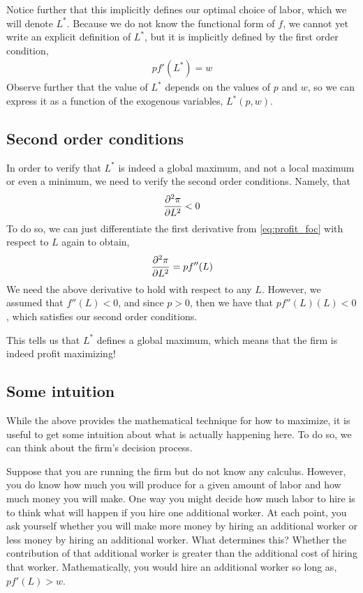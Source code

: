Notice further that this implicitly defines our optimal choice of labor, which we will denote $L^*$. Because we do not know the functional form of $f$, we cannot yet write an explicit definition of $L^*$, but it is implicitly defined by the first order condition,
\begin{align}
    p f'(L^*) = w \label{eq:general_foc}
\end{align}
Observe further that the value of $L^*$ depends on the values of $p$ and $w$, so we can express it as a function of the exogenous variables, $L^*(p, w)$. 

\subsection*{Second order conditions}
In order to verify that $L^*$ is indeed a global maximum, and not a local maximum or even a minimum, we need to verify the second order conditions. Namely, that
\begin{align*}
    \frac{\partial ^2\pi}{\partial L^2} < 0
\end{align*}
To do so, we can just differentiate the first derivative from \ref{eq:profit_foc} with respect to $L$ again to obtain, 
\begin{align}
    \frac{\partial ^2\pi}{\partial L^2} = pf''(L) \label{eq:generalized_soc}
\end{align}
We need the above derivative to hold with respect to any $L$. However, we assumed that $f''(L) < 0$, and since $p > 0$, then we have that $pf''(L)(L) < 0$, which satisfies our second order conditions.

This tells us that $L^*$ defines a global maximum, which means that the firm is indeed profit maximizing! 

\subsection*{Some intuition}
While the above provides the mathematical technique for how to maximize, it is useful to get some intuition about what is actually happening here. To do so, we can think about the firm's decision process.

Suppose that you are running the firm but do not know any calculus. However, you do know how much you will produce for a given amount of labor and how much money you will make. One way you might decide how much labor to hire is to think what will happen if you hire one additional worker. At each point, you ask yourself whether you will make more money by hiring an additional worker or less money by hiring an additional worker. What determines this? Whether the contribution of that additional worker is greater than the additional cost of hiring that worker. Mathematically, you would hire an additional worker so long as, $p f'(L) > w$. 

